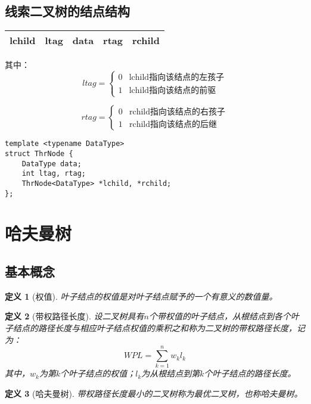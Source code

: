 \documentclass[12pt,a4paper]{amsart}
\newtheorem{definition}{定义}[section]
\begin{document}
\subsection{线索二叉树的结点结构}

\begin{center}
\begin{tabular}{|c|c|c|c|c|}
\hline
lchild & ltag & data & rtag & rchild \\
\hline
\end{tabular}
\end{center}

其中：
$$ltag = \begin{cases}
0 & \text{lchild指向该结点的左孩子} \\
1 & \text{lchild指向该结点的前驱}
\end{cases}$$

$$rtag = \begin{cases}
0 & \text{rchild指向该结点的右孩子} \\
1 & \text{rchild指向该结点的后继}
\end{cases}$$

\begin{lstlisting}[caption=线索二叉树结点定义]
template <typename DataType>
struct ThrNode {
    DataType data;
    int ltag, rtag;
    ThrNode<DataType> *lchild, *rchild;
};
\end{lstlisting}

\section{哈夫曼树}

\subsection{基本概念}

\begin{definition}[权值]
叶子结点的权值是对叶子结点赋予的一个有意义的数值量。
\end{definition}

\begin{definition}[带权路径长度]
设二叉树具有$n$个带权值的叶子结点，从根结点到各个叶子结点的路径长度与相应叶子结点权值的乘积之和称为二叉树的带权路径长度，记为：
$$WPL = \sum_{k=1}^{n} w_k l_k$$
其中，$w_k$为第$k$个叶子结点的权值；$l_k$为从根结点到第$k$个叶子结点的路径长度。
\end{definition}

\begin{definition}[哈夫曼树]
带权路径长度最小的二叉树称为最优二叉树，也称哈夫曼树。
\end{definition}
\end{document}

